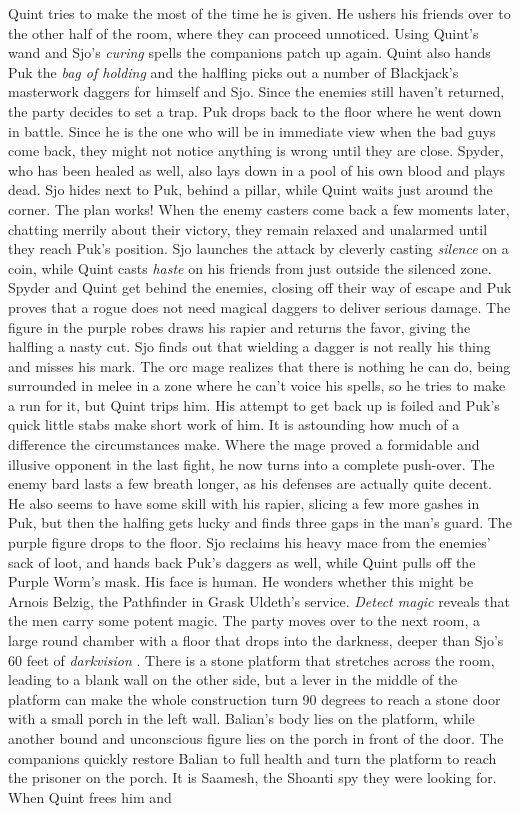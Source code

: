 Quint tries to make the most of the time he is given. He ushers his friends over to the other half of the room, where they can proceed unnoticed. Using Quint's wand and Sjo's {\itshape curing} spells the companions patch up again. Quint also hands Puk the  {\itshape bag of holding} and the halfling picks out a number of Blackjack's masterwork daggers for himself and Sjo. Since the enemies still haven't returned, the party decides to set a trap. Puk drops back to the floor where he went down in battle. Since he is the one who will be in immediate view when the bad guys come back, they might not notice anything is wrong until they are close. Spyder, who has been healed as well, also lays down in a pool of his own blood and plays dead. Sjo hides next to Puk, behind a pillar, while Quint waits just around the corner. The plan works! When the enemy casters come back a few moments later, chatting merrily about their victory, they remain relaxed and unalarmed until they reach Puk's position. Sjo launches the attack by cleverly casting {\itshape silence} on a coin, while Quint casts  {\itshape haste} on his friends from just outside the silenced zone. Spyder and Quint get behind the enemies, closing off their way of escape and Puk proves that a rogue does not need magical daggers to deliver serious damage. The figure in the purple robes draws his rapier and returns the favor, giving the halfling a nasty cut. Sjo finds out that wielding a dagger is not really his thing and misses his mark. The orc mage realizes that there is nothing he can do, being surrounded in melee in a zone where he can't voice his spells, so he tries to make a run for it, but Quint trips him. His attempt to get back up is foiled and Puk's quick little stabs make short work of him. It is astounding how much of a difference the circumstances make. Where the mage proved a formidable and illusive opponent in the last fight, he now turns into a complete push-over. The enemy bard lasts a few breath longer, as his defenses are actually quite decent. He also seems to have some skill with his rapier, slicing a few more gashes in Puk, but then the halfing gets lucky and finds three gaps in the man's guard. The purple figure drops to the floor. Sjo reclaims his heavy mace from the enemies' sack of loot, and hands back Puk's daggers as well, while Quint pulls off the Purple Worm's mask. His face is human. He wonders whether this might be Arnois Belzig, the Pathfinder in Grask Uldeth's service. {\itshape Detect magic} reveals that the men carry some potent magic. The party moves over to the next room, a large round chamber with a floor that drops into the darkness, deeper than Sjo's 60 feet of  {\itshape darkvision} . There is a stone platform that stretches across the room, leading to a blank wall on the other side, but a lever in the middle of the platform can make the whole construction turn 90 degrees to reach a stone door with a small porch in the left wall. Balian's body lies on the platform, while another bound and unconscious figure lies on the porch in front of the door. The companions quickly restore Balian to full health and turn the platform to reach the prisoner on the porch. It is Saamesh, the Shoanti spy they were looking for. When Quint frees him and 